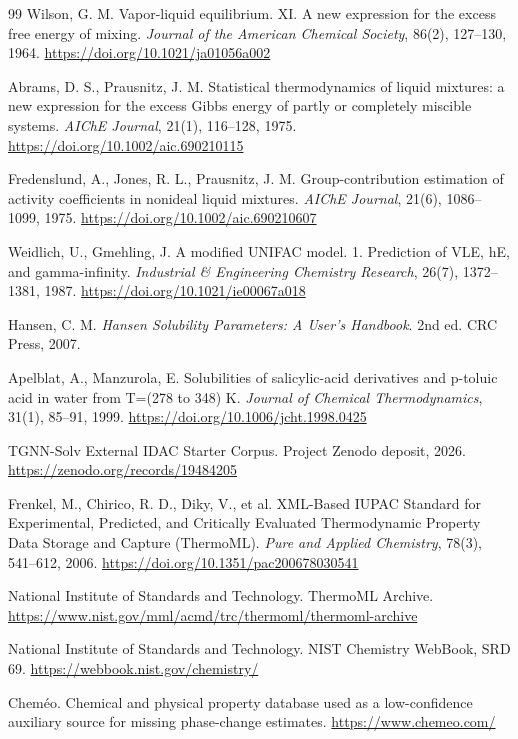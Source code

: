 \documentclass[11pt]{article}
\theoremstyle{definition}
\begin{document}
\begin{thebibliography}{99}
 Wilson, G. M. Vapor-liquid equilibrium. XI. A new expression for the excess free energy of mixing. \textit{Journal of the American Chemical Society}, 86(2), 127--130, 1964. \url{https://doi.org/10.1021/ja01056a002}

 Abrams, D. S., Prausnitz, J. M. Statistical thermodynamics of liquid mixtures: a new expression for the excess Gibbs energy of partly or completely miscible systems. \textit{AIChE Journal}, 21(1), 116--128, 1975. \url{https://doi.org/10.1002/aic.690210115}

 Fredenslund, A., Jones, R. L., Prausnitz, J. M. Group-contribution estimation of activity coefficients in nonideal liquid mixtures. \textit{AIChE Journal}, 21(6), 1086--1099, 1975. \url{https://doi.org/10.1002/aic.690210607}

 Weidlich, U., Gmehling, J. A modified UNIFAC model. 1. Prediction of VLE, hE, and gamma-infinity. \textit{Industrial \& Engineering Chemistry Research}, 26(7), 1372--1381, 1987. \url{https://doi.org/10.1021/ie00067a018}

 Hansen, C. M. \textit{Hansen Solubility Parameters: A User's Handbook}. 2nd ed. CRC Press, 2007.

 Apelblat, A., Manzurola, E. Solubilities of salicylic-acid derivatives and p-toluic acid in water from T=(278 to 348) K. \textit{Journal of Chemical Thermodynamics}, 31(1), 85--91, 1999. \url{https://doi.org/10.1006/jcht.1998.0425}

 TGNN-Solv External IDAC Starter Corpus. Project Zenodo deposit, 2026. \url{https://zenodo.org/records/19484205}

 Frenkel, M., Chirico, R. D., Diky, V., et al. XML-Based IUPAC Standard for Experimental, Predicted, and Critically Evaluated Thermodynamic Property Data Storage and Capture (ThermoML). \textit{Pure and Applied Chemistry}, 78(3), 541--612, 2006. \url{https://doi.org/10.1351/pac200678030541}

 National Institute of Standards and Technology. ThermoML Archive. \url{https://www.nist.gov/mml/acmd/trc/thermoml/thermoml-archive}

 National Institute of Standards and Technology. NIST Chemistry WebBook, SRD 69. \url{https://webbook.nist.gov/chemistry/}

 Cheméo. Chemical and physical property database used as a low-confidence auxiliary source for missing phase-change estimates. \url{https://www.chemeo.com/}


\end{thebibliography}
\end{document}
